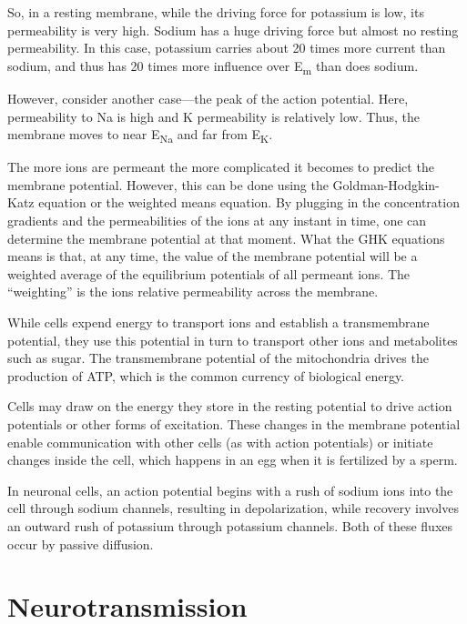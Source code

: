 So, in a resting membrane, while the driving force for potassium is low, its permeability is very high. Sodium has a huge driving force but almost no resting permeability. In this case, potassium carries about 20 times more current than sodium, and thus has 20 times more influence over E\textsubscript{m} than does sodium.

However, consider another case---the peak of the action potential. Here, permeability to Na is high and K permeability is relatively low. Thus, the membrane moves to near E\textsubscript{Na} and far from E\textsubscript{K}.

The more ions are permeant the more complicated it becomes to predict the membrane potential. However, this can be done using the Goldman-Hodgkin-Katz equation or the weighted means equation. By plugging in the concentration gradients and the permeabilities of the ions at any instant in time, one can determine the membrane potential at that moment. What the GHK equations means is that, at any time, the value of the membrane potential will be a weighted average of the equilibrium potentials of all permeant ions. The ``weighting'' is the ions relative permeability across the membrane.

While cells expend energy to transport ions and establish a transmembrane potential, they use this potential in turn to transport other ions and metabolites such as sugar. The transmembrane potential of the mitochondria drives the production of ATP, which is the common currency of biological energy.

Cells may draw on the energy they store in the resting potential to drive action potentials or other forms of excitation. These changes in the membrane potential enable communication with other cells (as with action potentials) or initiate changes inside the cell, which happens in an egg when it is fertilized by a sperm.

In neuronal cells, an action potential begins with a rush of sodium ions into the cell through sodium channels, resulting in depolarization, while recovery involves an outward rush of potassium through potassium channels. Both of these fluxes occur by passive diffusion.

\hypertarget{neurotransmission}{%
\chapter{Neurotransmission}\label{neurotransmission}}

